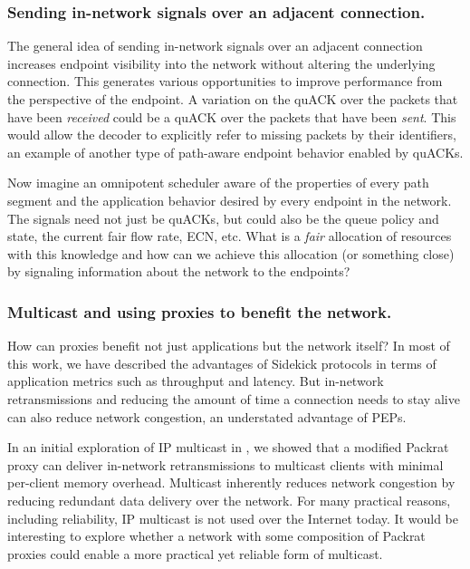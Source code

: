 \subsubsection{Sending in-network signals over an adjacent connection.}

The general idea of sending in-network signals over an adjacent connection
increases endpoint visibility into the network without altering the underlying
connection. This generates various opportunities to improve performance from
the perspective of the endpoint. A variation on the quACK over the packets that
have been \textit{received} could be a quACK over the packets that have been
\textit{sent}. This would allow the decoder to explicitly refer to missing
packets by their identifiers, an example of another type of path-aware endpoint
behavior enabled by quACKs.

Now imagine an omnipotent scheduler aware of the properties of every path
segment and the application behavior desired by every endpoint in the network.
The signals need not just be quACKs, but could also be the queue policy and
state, the current fair flow rate, ECN, etc. What is a \textit{fair} allocation
of resources with this knowledge and how can we achieve this allocation
(or something close) by signaling information about the network to the
endpoints?

\subsubsection{Multicast and using proxies to benefit the network.}

How can proxies benefit not just applications but the network itself? In most of
this work, we have described the advantages of Sidekick protocols in terms of
application metrics such as throughput and latency. But in-network
retransmissions and reducing the amount of time a connection needs to stay
alive can also reduce network congestion, an understated advantage of PEPs.

In an initial exploration of IP multicast in , we showed that
a modified Packrat proxy can deliver in-network retransmissions to multicast
clients with minimal per-client memory overhead. Multicast inherently reduces
network congestion by reducing redundant data delivery over the network. For
many practical reasons, including reliability, IP multicast is not used over
the Internet today. It would be interesting to explore whether a network with
some composition of Packrat proxies could enable a more practical yet reliable
form of multicast.

